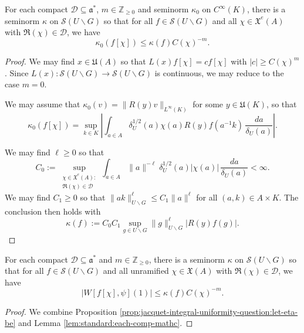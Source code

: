\begin{lemma}\label{lem:standard:each-comp-mathc}
  For each compact $\mathcal{D} \subseteq \mathfrak{a}^*$, $m \in \mathbb{Z}_{\geq 0}$ and seminorm $\kappa_0$ on $C^\infty(K)$, there is a seminorm $\kappa$ on $\mathcal{S}(U \backslash G)$ so that for all $f \in \mathcal{S}(U \backslash G)$ and all $\chi \in \mathfrak{X}^e(A)$ with $\Re(\chi) \in \mathcal{D}$, we have
  \begin{equation*}
    \kappa_0(f[\chi]) \leq \kappa(f) C(\chi)^{-m}.
  \end{equation*}
\end{lemma}
\begin{proof}
  We may find $x \in \mathfrak{U}(A)$ so that $L(x) f[\chi] = c f[\chi]$ with $|c| \geq C(\chi)^{m}$.  Since $L(x) : \mathcal{S}(U \backslash G) \rightarrow \mathcal{S}(U \backslash G)$ is continuous, we may reduce to the case $m = 0$.

  We may assume that $\kappa_0(v) = \|R(y) v\|_{L^\infty(K)}$ for some $y \in \mathfrak{U}(K)$, so that
  \begin{equation*}
    \kappa_0(f[\chi]) =
    \sup_{k \in K}
    \left\lvert
      \int_{a \in A}
      \delta_U^{1/2}(a) \chi(a)
      R(y) f(a^{-1} k)
      \, \frac{d a}{\delta_U(a)}
    \right\rvert.
  \end{equation*}

  We may find $\ell \geq 0$ so that
  \begin{equation*}
    C_0 := \sup_{
      \substack{
        \chi \in \mathfrak{X}^e(A) :  \\
        \Re(\chi) \in \mathcal{D}
      }
    }
    \int_{a \in A} \|a\|^{-\ell} \delta_U^{1/2}(a) |\chi(a)|  \, \frac{d a}{\delta_U(a)} < \infty.
  \end{equation*}
  We may find $C_1 \geq 0$ so that $\|a k\|_{U \backslash G}^{\ell} \leq C_1 \|a\|^{\ell}$ for all $(a,k) \in A \times K$.  The conclusion then holds with
  \begin{equation*}
    \kappa(f) := C_0 C_1 \sup_{g \in U \backslash G} \|g\|_{U \backslash G}^{\ell} |R(y) f(g)|.
  \end{equation*}
\end{proof}

\begin{lemma}\label{lem:standard:each-comp-mathc-1}
  For each compact $\mathcal{D} \subseteq \mathfrak{a}^*$ and $m \in \mathbb{Z}_{\geq 0}$, there is a seminorm $\kappa$ on $\mathcal{S}(U \backslash G)$ so that for all $f \in \mathcal{S}(U \backslash G)$ and all unramified $\chi \in \mathfrak{X}(A)$ with $\Re(\chi) \in \mathcal{D}$, we have
  \begin{equation*}
    |W[f[\chi], \psi](1)| \leq \kappa(f) C(\chi)^{-m}.
  \end{equation*}
\end{lemma}
\begin{proof}
  We combine Proposition \ref{prop:jacquet-integral-uniformity-question:let-eta-be} and Lemma \ref{lem:standard:each-comp-mathc}.
\end{proof}

